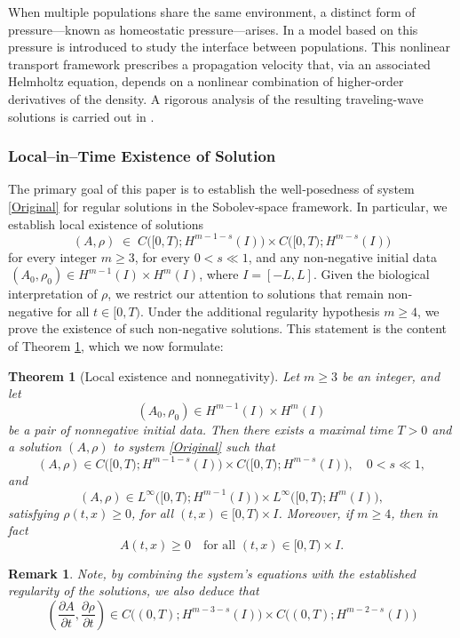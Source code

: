 \documentclass[12pt]{amsart}
\newtheorem{theorem}{Theorem}
\newtheorem{remark}{Remark}
\begin{document}
When multiple populations share the same environment, a distinct form of pressure—known as homeostatic pressure—arises. In \cite{basan2009homeostatic, ranft2014mechanically} a model based on this pressure is introduced to study the interface between populations. This nonlinear transport framework prescribes a propagation velocity that, via an associated Helmholtz equation, depends on a nonlinear combination of higher-order derivatives of the density. A rigorous analysis of the resulting traveling-wave solutions is carried out in \cite{campos2025biomechanical}.
\subsubsection*{\textbf{Local--in--Time Existence of Solution}}
    The primary goal of this paper is to establish the well‐posedness of system \eqref{Original} for regular solutions in the Sobolev‐space framework.  In particular, we establish local existence of solutions 
\[
(A,\rho)\;\in\;C\bigl([0,T);H^{m-1-s}(I)\bigr)\times C\bigl([0,T);H^{m-s}(I)\bigr)
\]
for every integer $m\ge3$, for every $0<s\ll1$, and any non‐negative initial data 
$\,(A_0,\rho_0)\in H^{m-1}(I)\times H^m(I)$, where $I=[-L,L]$.  
Given the biological interpretation of $\rho$, we restrict our attention to solutions that remain non‐negative for all $t\in[0,T)$.  Under the additional regularity hypothesis $m\ge4$, we prove the existence of such non‐negative solutions.  This statement is the content of Theorem \ref{TheoremExistence}, which we now formulate:   


\begin{theorem}[Local existence and nonnegativity]\label{TheoremExistence}
Let $m\ge3$ be an integer, and let
\[
(A_0,\rho_0)\in H^{m-1}(I)\times H^m(I)
\]
be a pair of nonnegative initial data.  Then there exists a maximal time $T>0$ and a solution $(A,\rho)$  to system \eqref{Original} such that
\[
(A,\rho)\in C\bigl([0,T);H^{m-1 -s}(I)\bigr)\times C\bigl([0,T);H^{m -s}(I)\bigr), \quad 0<s\ll1,
\]
and
$$(A,\rho)\in L^\infty \bigl([0,T);H^{m-1}(I)\bigr)\times L^\infty\bigl([0,T);H^m (I)\bigr),$$  satisfying $\rho(t,x)\ge0$, for all $(t,x)\in[0,T)\times I$.  Moreover, if $m\ge4$, then in fact
\[
A(t,x)\ge0
\quad
\text{for all }(t,x)\in[0,T)\times I.
\]
\end{theorem}
\begin{remark}
    Note, by combining the system’s equations with the established regularity of the solutions, we also deduce that
    \[
\left(\frac{\partial A}{\partial t},\frac{\partial\rho} {\partial t}\right)\in C\bigl((0,T);H^{m-3-s}(I)\bigr)\times C\bigl((0,T);H^{m-2-s}(I)\bigr)
\]
\end{remark}
\end{document}
